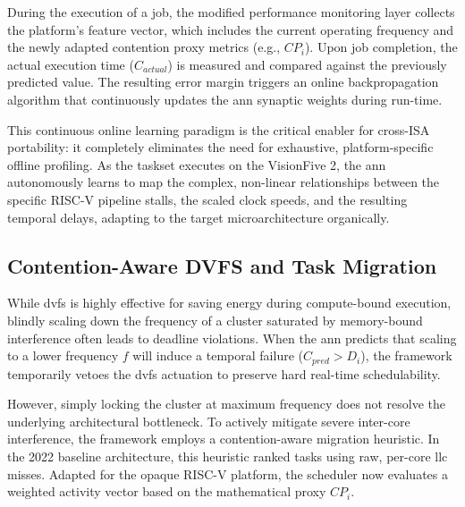 \documentclass[conference]{IEEEtran}
\begin{document}
During the execution of a job, the modified performance monitoring layer collects the platform's feature vector, which includes the current operating frequency and the newly adapted contention proxy metrics (e.g., $CP_i$). Upon job completion, the actual execution time ($C_{actual}$) is measured and compared against the previously predicted value. The resulting error margin triggers an online backpropagation algorithm that continuously updates the \gls{ann} synaptic weights during run-time. 

This continuous online learning paradigm is the critical enabler for cross-ISA portability: it completely eliminates the need for exhaustive, platform-specific offline profiling. As the taskset executes on the VisionFive 2, the \gls{ann} autonomously learns to map the complex, non-linear relationships between the specific RISC-V pipeline stalls, the scaled clock speeds, and the resulting temporal delays, adapting to the target microarchitecture organically.

\subsection{Contention-Aware DVFS and Task Migration}
\label{sec:task_migration}


While \gls{dvfs} is highly effective for saving energy during compute-bound execution, blindly scaling down the frequency of a cluster saturated by memory-bound interference often leads to deadline violations. When the \gls{ann} predicts that scaling to a lower frequency $f$ will induce a temporal failure ($C_{pred} > D_i$), the framework temporarily vetoes the \gls{dvfs} actuation to preserve hard real-time schedulability.

However, simply locking the cluster at maximum frequency does not resolve the underlying architectural bottleneck. To actively mitigate severe inter-core interference, the framework employs a contention-aware migration heuristic. In the 2022 baseline architecture, this heuristic ranked tasks using raw, per-core \gls{llc} misses. Adapted for the opaque RISC-V platform, the scheduler now evaluates a weighted activity vector based on the mathematical proxy $CP_i$. 
\end{document}
